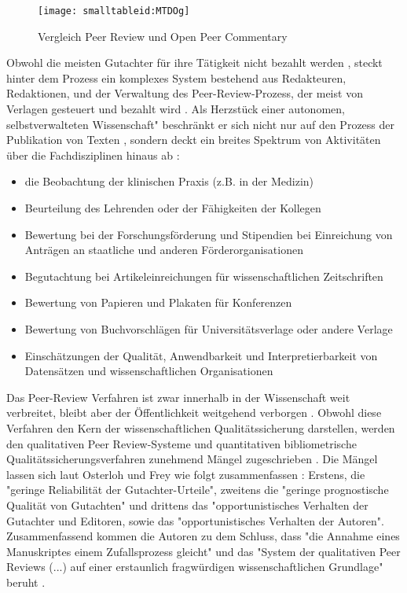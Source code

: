\begin{figure}[h!]
\texttt{[image: smalltableid:MTDOg]}
\caption{Vergleich Peer Review und Open Peer Commentary}
\end{figure}

Obwohl die meisten Gutachter für ihre Tätigkeit nicht bezahlt werden \cite{yiotis_2013_open}, steckt hinter dem Prozess ein komplexes System bestehend aus Redakteuren, Redaktionen, und der Verwaltung des Peer-Review-Prozess, der meist von Verlagen gesteuert und bezahlt wird \cite{Bargheer_2015} \cite{mueller_2009_peerreview} \cite{Baggs_2006}. Als Herzstück einer autonomen, selbstverwalteten Wissenschaft" \cite{suchen_Hornbostel_2006} beschränkt er sich nicht nur auf den Prozess der Publikation von Texten \cite{mueller_2009_peerreview}, sondern deckt ein breites Spektrum von Aktivitäten über die Fachdisziplinen hinaus ab \cite{Lee_2012}:
\begin{itemize}
\item die Beobachtung der klinischen Praxis (z.B. in der Medizin)
\item Beurteilung des Lehrenden oder der Fähigkeiten der Kollegen
\item Bewertung bei der Forschungsförderung und Stipendien bei Einreichung von Anträgen an staatliche und anderen Förderorganisationen
\item Begutachtung bei Artikeleinreichungen für wissenschaftlichen Zeitschriften
\item Bewertung von Papieren und Plakaten für Konferenzen
\item Bewertung von Buchvorschlägen für Universitätsverlage oder andere Verlage
\item Einschätzungen der Qualität, Anwendbarkeit und Interpretierbarkeit von Datensätzen und wissenschaftlichen Organisationen
\end{itemize}

Das Peer-Review Verfahren ist zwar innerhalb in der Wissenschaft weit verbreitet, bleibt aber der Öffentlichkeit weitgehend verborgen \cite{Konneker_2013}. Obwohl diese Verfahren den Kern der wissenschaftlichen Qualitätssicherung darstellen, werden den qualitativen Peer Review-Systeme und quantitativen bibliometrische Qualitätssicherungsverfahren zunehmend Mängel zugeschrieben \cite{Peters_2014} \cite{Lee_2012} \cite{bar_2009_wissenschaftliche} \cite{osterloh2008anreize} \cite{ware_2008_peer} \cite{Jansen_2007} \cite{smith_1999_opening}. Die Mängel lassen sich laut Osterloh und Frey wie folgt zusammenfassen \cite{osterloh2008anreize}: Erstens, die "geringe Reliabilität der Gutachter-Urteile", zweitens die "geringe prognostische Qualität von Gutachten" und drittens das "opportunistisches Verhalten der Gutachter und Editoren, sowie das "opportunistisches Verhalten der Autoren". Zusammenfassend kommen die Autoren zu dem Schluss, dass "die Annahme eines Manuskriptes einem Zufallsprozess gleicht" und das "System der qualitativen Peer Reviews (...) auf einer erstaunlich fragwürdigen wissenschaftlichen Grundlage" beruht \cite{osterloh2008anreize}.

